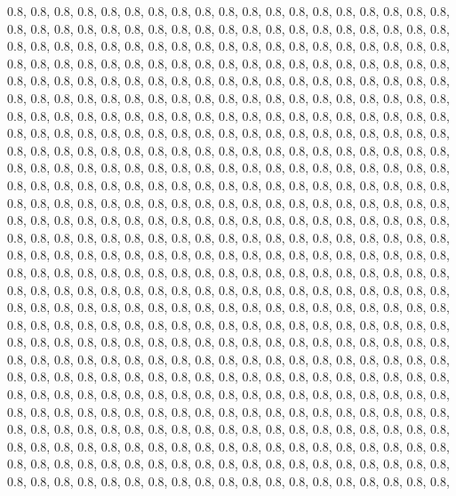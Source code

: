 \documentclass[11pt,]{article}
\begin{document}
0.8, 0.8, 0.8, 0.8, 0.8, 0.8, 0.8, 0.8, 0.8, 0.8, 0.8, 0.8, 0.8, 0.8,
0.8, 0.8, 0.8, 0.8, 0.8, 0.8, 0.8, 0.8, 0.8, 0.8, 0.8, 0.8, 0.8, 0.8,
0.8, 0.8, 0.8, 0.8, 0.8, 0.8, 0.8, 0.8, 0.8, 0.8, 0.8, 0.8, 0.8, 0.8,
0.8, 0.8, 0.8, 0.8, 0.8, 0.8, 0.8, 0.8, 0.8, 0.8, 0.8, 0.8, 0.8, 0.8,
0.8, 0.8, 0.8, 0.8, 0.8, 0.8, 0.8, 0.8, 0.8, 0.8, 0.8, 0.8, 0.8, 0.8,
0.8, 0.8, 0.8, 0.8, 0.8, 0.8, 0.8, 0.8, 0.8, 0.8, 0.8, 0.8, 0.8, 0.8,
0.8, 0.8, 0.8, 0.8, 0.8, 0.8, 0.8, 0.8, 0.8, 0.8, 0.8, 0.8, 0.8, 0.8,
0.8, 0.8, 0.8, 0.8, 0.8, 0.8, 0.8, 0.8, 0.8, 0.8, 0.8, 0.8, 0.8, 0.8,
0.8, 0.8, 0.8, 0.8, 0.8, 0.8, 0.8, 0.8, 0.8, 0.8, 0.8, 0.8, 0.8, 0.8,
0.8, 0.8, 0.8, 0.8, 0.8, 0.8, 0.8, 0.8, 0.8, 0.8, 0.8, 0.8, 0.8, 0.8,
0.8, 0.8, 0.8, 0.8, 0.8, 0.8, 0.8, 0.8, 0.8, 0.8, 0.8, 0.8, 0.8, 0.8,
0.8, 0.8, 0.8, 0.8, 0.8, 0.8, 0.8, 0.8, 0.8, 0.8, 0.8, 0.8, 0.8, 0.8,
0.8, 0.8, 0.8, 0.8, 0.8, 0.8, 0.8, 0.8, 0.8, 0.8, 0.8, 0.8, 0.8, 0.8,
0.8, 0.8, 0.8, 0.8, 0.8, 0.8, 0.8, 0.8, 0.8, 0.8, 0.8, 0.8, 0.8, 0.8,
0.8, 0.8, 0.8, 0.8, 0.8, 0.8, 0.8, 0.8, 0.8, 0.8, 0.8, 0.8, 0.8, 0.8,
0.8, 0.8, 0.8, 0.8, 0.8, 0.8, 0.8, 0.8, 0.8, 0.8, 0.8, 0.8, 0.8, 0.8,
0.8, 0.8, 0.8, 0.8, 0.8, 0.8, 0.8, 0.8, 0.8, 0.8, 0.8, 0.8, 0.8, 0.8,
0.8, 0.8, 0.8, 0.8, 0.8, 0.8, 0.8, 0.8, 0.8, 0.8, 0.8, 0.8, 0.8, 0.8,
0.8, 0.8, 0.8, 0.8, 0.8, 0.8, 0.8, 0.8, 0.8, 0.8, 0.8, 0.8, 0.8, 0.8,
0.8, 0.8, 0.8, 0.8, 0.8, 0.8, 0.8, 0.8, 0.8, 0.8, 0.8, 0.8, 0.8, 0.8,
0.8, 0.8, 0.8, 0.8, 0.8, 0.8, 0.8, 0.8, 0.8, 0.8, 0.8, 0.8, 0.8, 0.8,
0.8, 0.8, 0.8, 0.8, 0.8, 0.8, 0.8, 0.8, 0.8, 0.8, 0.8, 0.8, 0.8, 0.8,
0.8, 0.8, 0.8, 0.8, 0.8, 0.8, 0.8, 0.8, 0.8, 0.8, 0.8, 0.8, 0.8, 0.8,
0.8, 0.8, 0.8, 0.8, 0.8, 0.8, 0.8, 0.8, 0.8, 0.8, 0.8, 0.8, 0.8, 0.8,
0.8, 0.8, 0.8, 0.8, 0.8, 0.8, 0.8, 0.8, 0.8, 0.8, 0.8, 0.8, 0.8, 0.8,
0.8, 0.8, 0.8, 0.8, 0.8, 0.8, 0.8, 0.8, 0.8, 0.8, 0.8, 0.8, 0.8, 0.8,
0.8, 0.8, 0.8, 0.8, 0.8, 0.8, 0.8, 0.8, 0.8, 0.8, 0.8, 0.8, 0.8, 0.8,
0.8, 0.8, 0.8, 0.8, 0.8, 0.8, 0.8, 0.8, 0.8, 0.8, 0.8, 0.8, 0.8, 0.8,
0.8, 0.8, 0.8, 0.8, 0.8, 0.8, 0.8, 0.8, 0.8, 0.8, 0.8, 0.8, 0.8, 0.8,
0.8, 0.8, 0.8, 0.8, 0.8, 0.8, 0.8, 0.8, 0.8, 0.8, 0.8, 0.8, 0.8, 0.8,
0.8, 0.8, 0.8, 0.8, 0.8, 0.8, 0.8, 0.8, 0.8, 0.8, 0.8, 0.8, 0.8, 0.8,
0.8, 0.8, 0.8, 0.8, 0.8, 0.8, 0.8, 0.8, 0.8, 0.8, 0.8, 0.8, 0.8, 0.8,
0.8, 0.8, 0.8, 0.8, 0.8, 0.8, 0.8, 0.8, 0.8, 0.8, 0.8, 0.8, 0.8, 0.8,
0.8, 0.8, 0.8, 0.8, 0.8, 0.8, 0.8, 0.8, 0.8, 0.8, 0.8, 0.8, 0.8, 0.8,
0.8, 0.8, 0.8, 0.8, 0.8, 0.8, 0.8, 0.8, 0.8, 0.8, 0.8, 0.8, 0.8, 0.8,
0.8, 0.8, 0.8, 0.8, 0.8, 0.8, 0.8, 0.8, 0.8, 0.8, 0.8, 0.8, 0.8, 0.8,
0.8, 0.8, 0.8, 0.8, 0.8, 0.8, 0.8, 0.8, 0.8, 0.8, 0.8, 0.8, 0.8, 0.8,
0.8, 0.8, 0.8, 0.8, 0.8, 0.8, 0.8, 0.8, 0.8, 0.8, 0.8, 0.8, 0.8, 0.8,
\end{document}
